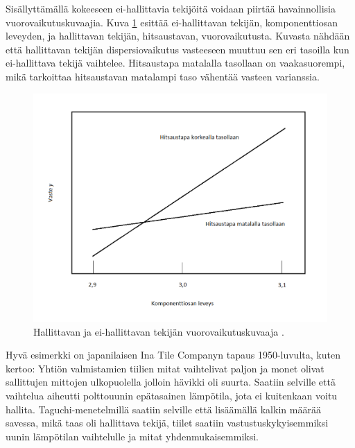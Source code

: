 \documentclass[12pt,a4paper,finnish]{tutthesis}
\begin{document}
Sisällyttämällä kokeeseen ei-hallittavia tekijöitä voidaan piirtää
havainnollisia vuorovaikutuskuvaajia. Kuva \ref{fig:slope} esittää ei-hallittavan
tekijän, komponenttiosan leveyden, ja hallittavan tekijän, hitsaustavan, vuorovaikutusta.
Kuvasta nähdään että hallittavan tekijän dispersiovaikutus vasteeseen muuttuu sen eri tasoilla
kun ei-hallittava tekijä vaihtelee. Hitsaustapa matalalla tasollaan on vaakasuorempi,
mikä tarkoittaa hitsaustavan matalampi taso vähentää vasteen varianssia.


\begin{figure}
  \begin{center}
    \includegraphics[scale=0.6]{slope}
  \end{center}
  \caption[Tekijöiden vuorovaikutuskuvaaja]{Hallittavan ja ei-hallittavan tekijän vuorovaikutuskuvaaja \parencite[s.~24]{Bursztyn}.}
  \label{fig:slope}
\end{figure}


Hyvä esimerkki on japanilaisen Ina Tile Companyn tapaus 1950-luvulta,
kuten \textcite{Kackar1989} kertoo:
Yhtiön valmistamien tiilien mitat vaihtelivat paljon ja monet olivat sallittujen mittojen ulkopuolella
jolloin hävikki oli suurta.
Saatiin selville että vaihtelua aiheutti polttouunin epätasainen lämpötila,
jota ei kuitenkaan voitu hallita. Taguchi-menetelmillä saatiin selville että
lisäämällä kalkin määrää savessa, mikä taas oli hallittava tekijä, tiilet saatiin
vastustuskykyisemmiksi uunin lämpötilan vaihtelulle ja mitat yhdenmukaisemmiksi.
\end{document}
